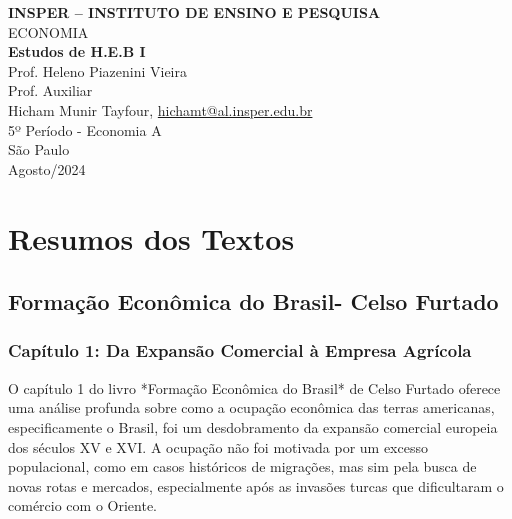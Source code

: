 \documentclass[a4paper,12pt]{article}[abntex2]
\begin{document}
\begin{titlepage}
    \centering
    \vspace*{1cm}
    \Large\textbf{INSPER – INSTITUTO DE ENSINO E PESQUISA}\\
    \Large ECONOMIA\\
    \vspace{1.5cm}
    \Large\textbf{Estudos de H.E.B I}\\
    \vspace{1.5cm}
    Prof. Heleno Piazenini Vieira\\
    Prof. Auxiliar \\
    \vfill
    \normalsize
    Hicham Munir Tayfour, \href{mailto:hichamt@al.insper.edu.br}{hichamt@al.insper.edu.br}\\
    5º Período - Economia A\\
    \vfill
    São Paulo\\
    Agosto/2024
\end{titlepage}

\newpage
\tableofcontents
\thispagestyle{empty} %
\newpage
\setcounter{page}{1} %
\justify
\onehalfspacing

\pagestyle{fancy}
\fancyhf{}
\rhead{\thepage}

\section{\textbf{Resumos dos Textos}}
\subsection{\textbf{Formação Econômica do Brasil- Celso Furtado}}
\subsubsection{\textbf{Capítulo 1: Da Expansão Comercial à Empresa Agrícola}}

O capítulo 1 do livro *Formação Econômica do Brasil* de Celso Furtado oferece uma análise profunda sobre como a ocupação econômica das terras americanas, especificamente o Brasil, foi um desdobramento da expansão comercial europeia dos séculos XV e XVI. A ocupação não foi motivada por um excesso populacional, como em casos históricos de migrações, mas sim pela busca de novas rotas e mercados, especialmente após as invasões turcas que dificultaram o comércio com o Oriente.
\end{document}
